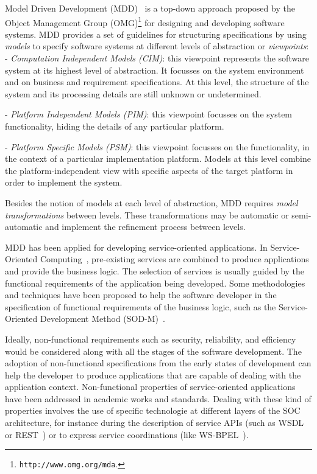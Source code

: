 Model Driven Development (MDD)~\cite{Favre06arigorous} is a top-down approach proposed by the Object Management Group
(OMG)\footnote{\texttt{http://www.omg.org/mda}.} for designing and developing software systems.
MDD provides a set of guidelines for  structuring  specifications by using \textit{models} to specify software systems at different levels of abstraction or \textit{viewpoints}:\\[1mm]
\noindent
- \textit{Computation Independent Models (CIM)}: this viewpoint represents the software system at its highest level of abstraction. It focusses on the system
environment and on  business and requirement specifications.
At this level, the structure of the system  and its processing details are still unknown or undetermined.

\noindent
- \textit{Platform Independent Models (PIM)}: this viewpoint focusses on the system functionality, hiding the details of any particular platform.

\noindent
- \textit{Platform Specific Models (PSM)}: this viewpoint focusses on the functionality, in the context of a particular implementation platform.
Models at this level combine the platform-independent view with specific aspects of the target platform in order to implement the system.

Besides the notion of models at each level of abstraction, MDD requires  \textit{model transformations} between levels.
These transformations may be automatic or semi-automatic and implement the refinement process between levels.

MDD has been applied for developing service-oriented applications.
In Service-Oriented Computing~\cite{scube2010book}, pre-existing services are
combined to produce applications and provide the business logic. The selection of services is usually guided by the functional requirements of the application being developed.
Some methodologies and techniques have been proposed to help the software
developer in the specification of functional requirements of the business logic,
such as the Service-Oriented Development Method
(SOD-M)~\cite{decastro1}.

Ideally, non-functional requirements such as
security, reliability, and efficiency
would be considered along with all the stages of the software development. The
adoption of non-functional specifications from the early states of development
can help the developer to produce applications that are capable of dealing with
the application context.
%
%
Non-functional properties of service-oriented applications  have been
addressed in academic works and standards. %
Dealing with these kind of properties involves the use of specific technologie
at different layers of the SOC architecture, for instance during the description
of service APIs (such as WSDL\cite{wsdl} or REST~\cite{rest}) or to express
service coordinations (like WS-BPEL~\cite{bpel03}).

